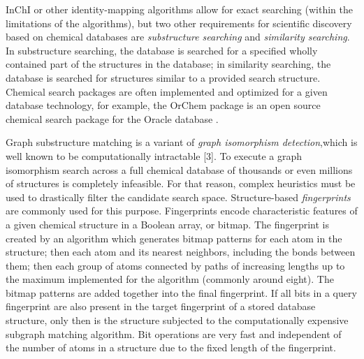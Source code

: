 \documentclass{sig-alternate}
\begin{document}

InChI or other identity-mapping algorithms allow for exact searching
(within the limitations of the algorithms), but two other requirements
for scientific discovery based on chemical databases are
\emph{substructure searching} and \emph{similarity searching}. In
substructure searching, the database is searched for a specified
wholly contained part of the structures in the database; in similarity
searching, the database is searched for structures similar to a
provided search structure. Chemical search packages are often
implemented and optimized for a given database technology, for
example, the OrChem package is an open source chemical search package
for the Oracle database \cite{rijnbeek2009}.

Graph substructure matching is a variant of \emph{graph isomorphism
  detection},which is well known to be computationally intractable
[3]. To execute a graph isomorphism search across a full chemical
database of thousands or even millions of structures is completely
infeasible. For that reason, complex heuristics must be used to
drastically filter the candidate search space. Structure-based
\emph{fingerprints} are commonly used for this purpose. Fingerprints
encode characteristic features of a given chemical structure in a
Boolean array, or bitmap. The fingerprint is created by an algorithm
which generates bitmap patterns for each atom in the structure; then
each atom and its nearest neighbors, including the bonds between them;
then each group of atoms connected by paths of increasing lengths up
to the maximum implemented for the algorithm (commonly around
eight). The bitmap patterns are added together into the final
fingerprint. If all bits in a query fingerprint are also present in
the target fingerprint of a stored database structure, only then is
the structure subjected to the computationally expensive subgraph
matching algorithm. Bit operations are very fast and independent of
the number of atoms in a structure due to the fixed length of the
fingerprint.
\end{document}
